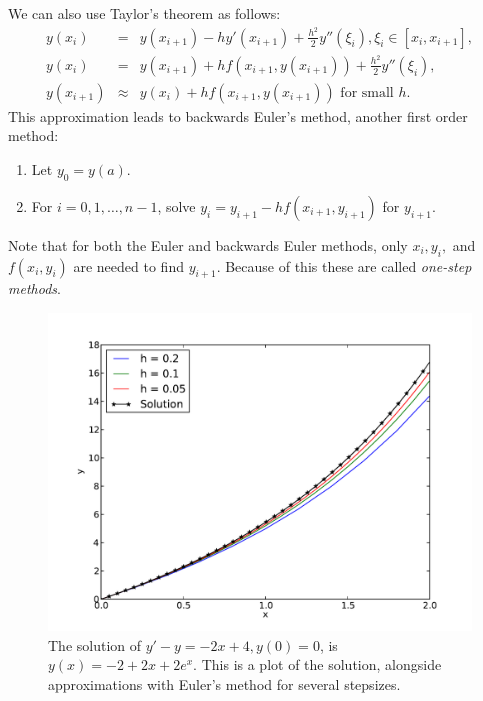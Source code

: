 We can also use Taylor's theorem as follows: 
\begin{eqnarray*}
y(x_{i}) &=& y(x_{i+1}) - h y'(x_{i+1}) + \frac{h^2}{2} y''(\xi_i), \xi_i \in [x_i,x_{i+1}], \\
y(x_{i}) &=& y(x_{i+1}) + h f(x_{i+1},y(x_{i+1})) + \frac{h^2}{2} y''(\xi_i),\\
y(x_{i+1}) &\approx & y(x_{i}) + h f(x_{i+1},y(x_{i+1}))  \text{ for small } h .
\end{eqnarray*}
This approximation leads to backwards Euler's method, another first order method: 
\begin{enumerate}
\item Let $y_0 = y(a)$. 
\item For $i = 0, 1, \hdots, n-1$, solve  $y_{i} = y_{i+1}-hf(x_{i+1},y_{i+1})$ for $y_{i+1}$. 
\end{enumerate}

Note that for both the Euler and backwards Euler methods, only $x_i, y_i,$ and $f(x_i,y_i)$ are needed to find $y_{i+1}$. Because of this these are called \textit{one-step methods}. 




\begin{figure}[ht]
\centering
\includegraphics[width=\textwidth]{Fig1.pdf}
\caption{The solution of $y' -y= -2x+4, y(0) = 0$, is $y(x) = -2+2x + 2e^x.$ This is a plot of the solution, alongside approximations with Euler's method for several stepsizes.}
\label{ivp:euler}
\end{figure}



